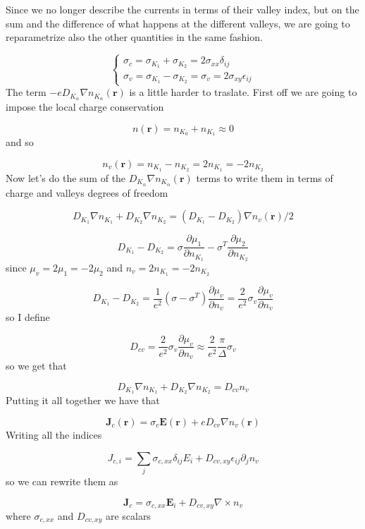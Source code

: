 Since we no longer describe the currents in terms of their valley index, but on the sum and the difference of what happens at the different valleys, we are going to reparametrize also the other quantities in the same fashion.


\begin{equation}
    \begin{cases}
        \sigma_c=\sigma_{K_1}+\sigma_{K_2}=2\sigma_{xx}\delta_{ij}\\
        \sigma_v=\sigma_{K_1}-\sigma_{K_2}=\sigma_v=2\sigma_{xy}\epsilon_{ij}
    \end{cases}
\end{equation}
The term $-eD_{K_\alpha}\nabla n_{K_\alpha}(\mathbf r)$ is a little harder to traslate. First off we are going to impose the local charge conservation

\[
    n(\mathbf r)=n_{K_0}+n_{K_1}\approx 0
\]
and so 

\begin{equation}
    n_v(\mathbf r)=n_{K_1}-n_{K_2}=2n_{K_1}=-2n_{K_2}
\end{equation}
Now let's do the sum of the $D_{K_\alpha}\nabla n_{K_\alpha}(\mathbf r)$ terms to write them in terms of charge and valleys degrees of freedom

\[D_{K_1}\nabla n_{K_1}+D_{K_2}\nabla n_{K_2}=(D_{K_1}-D_{K_2})\nabla n_v(\mathbf r)/2\]

\[D_{K_1}-D_{K_2}=\sigma \frac{\partial \mu_1}{\partial n_{K_1}}- \sigma^T \frac{\partial \mu_2}{\partial n_{K_2}}\]
since $\mu_v=2\mu_1=-2\mu_2$ and $n_v=2n_{K_1}=-2n_{K_2}$

\[D_{K_1}-D_{K_2}=\frac 1{e^2}(\sigma-\sigma^T)\frac{\partial \mu_v}{\partial n_v}=\frac 2{e^2}\sigma_v\frac{\partial \mu_v}{\partial n_v}\]
so I define 

\[D_{cv}=\frac 2{e^2}\sigma_v\frac{\partial \mu_v}{\partial n_v}\approx\frac 2{e^2} \frac \pi\Delta\sigma_v\]
so we get that

\[D_{K_1}\nabla n_{K_1}+D_{K_2}\nabla n_{K_2}=D_{cv}n_v\]
Putting it all together we have that

\[\mathbf J_c(\mathbf r)=\sigma_c \mathbf E(\mathbf r)+eD_{cv}\nabla n_v(\mathbf r)\]
Writing all the indices

\[J_{c,i}=\sum_j \sigma_{c,xx}\delta_{ij}E_i+D_{cv,xy}\epsilon_{ij}\partial_j n_v\]
so we can rewrite them as

\[\mathbf J_{c}= \sigma_{c,xx}\mathbf E_i + D_{cv,xy} \nabla \times n_v\]
where $\sigma_{c,xx}$ and $D_{cv,xy}$ are scalars

